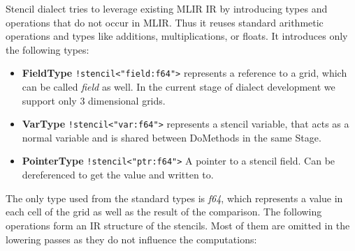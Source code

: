 \documentclass[sigplan,\review anonymous]{acmart}
\begin{document}
Stencil dialect tries to leverage existing MLIR IR by introducing types and
operations that do not occur in MLIR. Thus it reuses standard arithmetic
operations and types like additions, multiplications, or floats. It
introduces only the following types:
\begin{itemize}
  \item \textbf{FieldType} \texttt{!stencil<"field:f64">} represents a
  reference to a grid, which can be called \textit{field} as well. In
  the current stage of dialect development we support only 3 dimensional grids.
  \item \textbf{VarType} \texttt{!stencil<"var:f64">} represents a stencil
  variable, that acts as a normal variable and is shared between
  DoMethods in the same Stage.
  \item \textbf{PointerType} \texttt{!stencil<"ptr:f64">} A pointer to
  a stencil field. Can be dereferenced to get the value and written to.
\end{itemize}

The only type used from the standard types is \textit{f64}, which represents a
value in each cell of the grid as well as the result of the comparison.
The following operations form an IR structure of the stencils. Most of them
are omitted in the lowering passes as they do not influence the computations:
\end{document}
